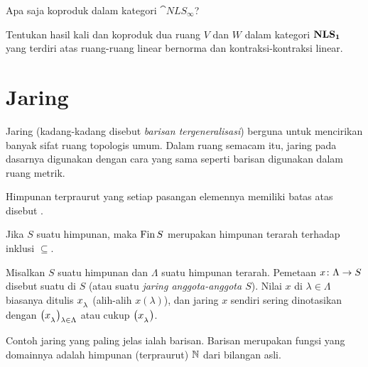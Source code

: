 \begin{exer} Apa saja koproduk dalam kategori $\cat{NLS_{\boldsymbol\infty}}$?
\end{exer}

\begin{exer} Tentukan hasil kali dan koproduk dua ruang $V$ dan $W$ dalam kategori
$\mathbf{NLS_{\mathbf{1}}}$ yang terdiri atas ruang-ruang linear bernorma dan kontraksi-kontraksi linear.
\end{exer}




















\section{Jaring}\label{C0314}
Jaring (kadang-kadang disebut \emph{barisan tergeneralisasi}) berguna untuk mencirikan banyak
sifat ruang topologis umum. Dalam ruang semacam itu, jaring pada dasarnya digunakan
dengan cara yang sama seperti barisan digunakan dalam ruang metrik.

\begin{defn} Himpunan terpraurut yang setiap pasangan elemennya memiliki batas atas disebut
.
\end{defn}

\begin{exam}\label{C031414} Jika $S$ suatu himpunan, maka $\operatorname{Fin} S$ merupakan himpunan terarah terhadap
inklusi $\subseteq$.
\end{exam}

\begin{defn} Misalkan $S$ suatu himpunan dan $\Lambda$ suatu himpunan terarah. Pemetaan
$x\colon \Lambda \rightarrow S$ disebut suatu
 di $S$ (atau suatu \emph{jaring anggota-anggota $S$}). Nilai $x$ di $\lambda \in
\Lambda$ biasanya ditulis $x_{{}_{\scriptstyle{\lambda}}}$ (alih-alih $x(\lambda)$), dan jaring $x$
sendiri sering dinotasikan dengan $\bigl(x_{{}_{\scriptstyle{\lambda}}}\bigr)_{\lambda \in \Lambda}$ atau cukup
$\bigl(x_{{}_{\scriptstyle{\lambda}}}\bigr)$.
\end{defn}

\begin{exam} Contoh jaring yang paling jelas ialah barisan. Barisan merupakan fungsi yang domainnya adalah himpunan (terpraurut) $\mathbb{N}$ dari bilangan asli.
\end{exam}

